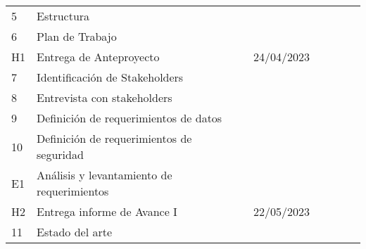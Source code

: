\begin{longtable}[c]{@{}llllllll@{}}
	5                                      & Estructura                                      &                                       &                                          &               &                &                  &                 \\
	6                                      & Plan de Trabajo                                 &                                       &                                          &               &                &                  &                 \\
	H1                                     & Entrega de Anteproyecto                         & \multicolumn{2}{l}{24/04/2023}        &                                          &               &                &                                    \\
	7                                      & Identificación de Stakeholders                  &                                       &                                          &               &                &                  &                 \\
	8                                      & Entrevista con stakeholders                     &                                       &                                          &               &                &                  &                 \\
	9                                      & Definición de requerimientos de datos           &                                       &                                          &               &                &                  &                 \\
	10                                     & Definición de requerimientos de seguridad       &                                       &                                          &               &                &                  &                 \\
	E1                                     & Análisis y levantamiento de requerimientos      &                                       &                                          &               &                &                  &                 \\
	H2                                     & Entrega informe de Avance I                     & \multicolumn{2}{l}{22/05/2023}        &                                          &               &                &                                    \\
	11                                     & Estado del arte                                 &                                       &                                          &               &                &                  &                 \\

\end{longtable}
